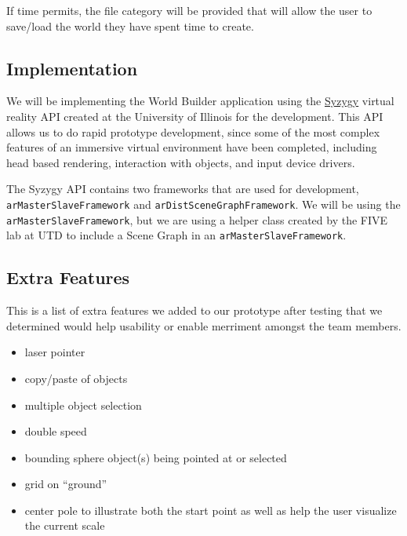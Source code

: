 If time permits, the file category will be provided that will allow the user to save/load the world they have spent time to create.

\subsection{Implementation}
We will be implementing the World Builder application using the \href{http://syzygy.isl.uiuc.edu/szg/szgsrc/doc/index.html}{Syzygy} virtual reality API created at the University of Illinois for the development.
This API allows us to do rapid prototype development, since some of the most complex features of an immersive virtual environment have been completed, including head based rendering, interaction with objects, and input device drivers.

The Syzygy API contains two frameworks that are used for development, \verb|arMasterSlaveFramework| and \verb|arDistSceneGraphFramework|.
We will be using the \verb|arMasterSlaveFramework|, but we are using a helper class created by the FIVE lab at UTD to include a Scene Graph in an \verb|arMasterSlaveFramework|.

\subsection{Extra Features}
This is a list of extra features we added to our prototype after testing that we determined would help usability or enable merriment amongst the team members.

\begin{itemize}
    \item laser pointer
    \item copy/paste of objects
    \item multiple object selection
    \item double speed
    \item bounding sphere object(s) being pointed at or selected
    \item grid on ``ground''
    \item center pole to illustrate both the start point as well as help the user visualize the current scale
\end{itemize}


